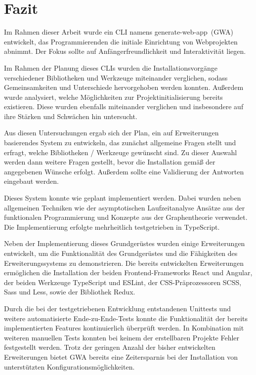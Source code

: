 \section{Fazit}
\label{fazit}

Im Rahmen dieser Arbeit wurde ein \gls{CLI} namens \glqq generate-web-app\grqq\ (\gls{GWA}) entwickelt, das Programmierenden die initiale Einrichtung von Webprojekten abnimmt. Der Fokus sollte auf Anfängerfreundlichkeit und Interaktivität liegen.

Im Rahmen der Planung dieses \gls{CLI}s wurden die Installationsvorgänge verschiedener Bibliotheken und Werkzeuge miteinander verglichen, sodass Gemeinsamkeiten und Unterschiede hervorgehoben werden konnten. Außerdem wurde analysiert, welche Möglichkeiten zur Projektinitialisierung bereits existieren. Diese wurden ebenfalls miteinander verglichen und insbesondere auf ihre Stärken und Schwächen hin untersucht.

Aus diesen Untersuchungen ergab sich der Plan, ein auf Erweiterungen basierendes System zu entwickeln, das zunächst allgemeine Fragen stellt und erfragt, welche Bibliotheken / Werkzeuge gewünscht sind. Zu dieser Auswahl werden dann weitere Fragen gestellt, bevor die Installation gemäß der angegebenen Wünsche erfolgt. Außerdem sollte eine Validierung der Antworten eingebaut werden.

Dieses System konnte wie geplant implementiert werden. Dabei wurden neben allgemeinen Techniken wie der asymptotischen Laufzeitanalyse Ansätze aus der funktionalen Programmierung und Konzepte aus der Graphentheorie verwendet. Die Implementierung erfolgte mehrheitlich testgetrieben in TypeScript.

Neben der Implementierung dieses Grundgerüstes wurden einige Erweiterungen entwickelt, um die Funktionalität des Grundgerüstes und die Fähigkeiten des Erweiterungssystems zu demonstrieren. Die bereits entwickelten Erweiterungen ermöglichen die Installation der beiden Frontend-Frameworks React und Angular, der beiden Werkzeuge TypeScript und ESLint, der CSS-Präprozessoren SCSS, Sass und Less, sowie der Bibliothek Redux.

Durch die bei der testgetriebenen Entwicklung entstandenen Unittests und weitere automatisierte Ende-zu-Ende-Tests konnte die Funktionalität der bereits implementierten Features kontinuierlich überprüft werden. In Kombination mit weiteren manuellen Tests konnten bei keinem der erstellbaren Projekte Fehler festgestellt werden. Trotz der geringen Anzahl der bisher entwickelten Erweiterungen bietet \gls{GWA} bereits eine Zeitersparnis bei der Installation von unterstützten Konfigurationsmöglichkeiten.